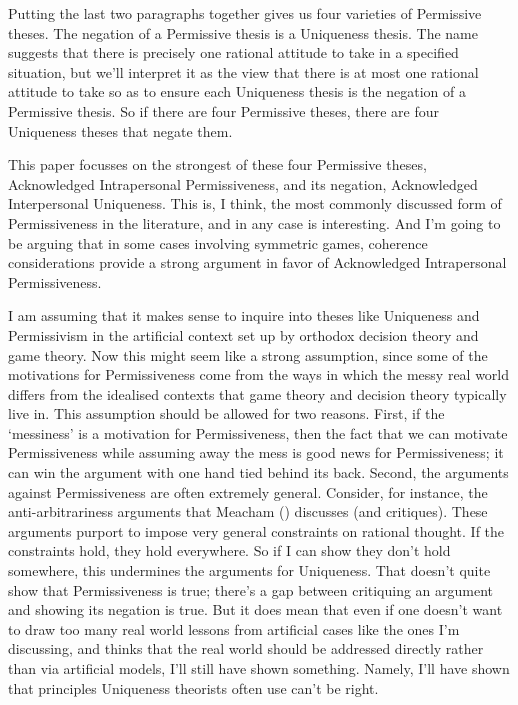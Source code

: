 \documentclass[
  11pt,
  letterpaper,
  DIV=11,
  numbers=noendperiod,
  twoside]{scrartcl}
\begin{document}
Putting the last two paragraphs together gives us four varieties of
Permissive theses. The negation of a Permissive thesis is a Uniqueness
thesis. The name suggests that there is precisely one rational attitude
to take in a specified situation, but we'll interpret it as the view
that there is at most one rational attitude to take so as to ensure each
Uniqueness thesis is the negation of a Permissive thesis. So if there
are four Permissive theses, there are four Uniqueness theses that negate
them.

This paper focusses on the strongest of these four Permissive theses,
Acknowledged Intrapersonal Permissiveness, and its negation,
Acknowledged Interpersonal Uniqueness. This is, I think, the most
commonly discussed form of Permissiveness in the literature, and in any
case is interesting. And I'm going to be arguing that in some cases
involving symmetric games, coherence considerations provide a strong
argument in favor of Acknowledged Intrapersonal Permissiveness.

I am assuming that it makes sense to inquire into theses like Uniqueness
and Permissivism in the artificial context set up by orthodox decision
theory and game theory. Now this might seem like a strong assumption,
since some of the motivations for Permissiveness come from the ways in
which the messy real world differs from the idealised contexts that game
theory and decision theory typically live in. This assumption should be
allowed for two reasons. First, if the `messiness' is a motivation for
Permissiveness, then the fact that we can motivate Permissiveness while
assuming away the mess is good news for Permissiveness; it can win the
argument with one hand tied behind its back. Second, the arguments
against Permissiveness are often extremely general. Consider, for
instance, the anti-arbitrariness arguments that Meacham
() discusses (and critiques). These
arguments purport to impose very general constraints on rational
thought. If the constraints hold, they hold everywhere. So if I can show
they don't hold somewhere, this undermines the arguments for Uniqueness.
That doesn't quite show that Permissiveness is true; there's a gap
between critiquing an argument and showing its negation is true. But it
does mean that even if one doesn't want to draw too many real world
lessons from artificial cases like the ones I'm discussing, and thinks
that the real world should be addressed directly rather than via
artificial models, I'll still have shown something. Namely, I'll have
shown that principles Uniqueness theorists often use can't be right.
\end{document}
